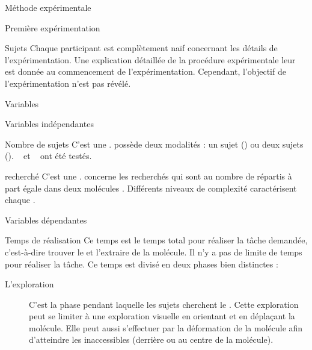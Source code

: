\documentclass[myfrancais,ngerman,english,french]{mythesis}
\begin{document}
\begin{mychapter}{Méthode expérimentale}
\begin{mysection}{Première expérimentation}
\begin{mysubsection}{Sujets}
				Chaque participant est complètement naïf concernant les détails de l'expérimentation.
				Une explication détaillée de la procédure expérimentale leur est donnée au commencement de l'expérimentation.
				Cependant, l'objectif de l'expérimentation n'est pas révélé.
			\end{mysubsection}
			\begin{mysubsection}{Variables}
				\begin{mysubsubsection}{Variables indépendantes}
					\begin{myparagraph}{ Nombre de sujets}
						C'est une .
						 possède deux modalités : \og un sujet \fg (\mycf {}) ou \og deux sujets \fg (\mycf {}).
						~ et ~ ont été testés.
					\end{myparagraph}
					\begin{myparagraph}{  recherché}
						C'est une .
						 concerne les  recherchés qui sont au nombre de  répartis à part égale dans deux molécules .
						Différents niveaux de complexité caractérisent chaque  .
					\end{myparagraph}
				\end{mysubsubsection}
				\begin{mysubsubsection}{Variables dépendantes}
					\begin{myparagraph}{ Temps de réalisation}
						Ce temps est le temps total pour réaliser la tâche demandée, c'est-à-dire trouver le  et l'extraire de la molécule.
						Il n'y a pas de limite de temps pour réaliser la tâche.
						Ce temps est divisé en deux phases bien distinctes :
						\begin{description}
							\item[L'exploration] C'est la phase pendant laquelle les sujets cherchent le .
								Cette exploration peut se limiter à une exploration visuelle en orientant et en déplaçant la molécule.
								Elle peut aussi s'effectuer par la déformation de la molécule afin d'atteindre les  inaccessibles (derrière ou au centre de la molécule).

\end{description}
\end{myparagraph}
\end{mysubsubsection}
\end{mysubsection}
\end{mysection}
\end{mychapter}
\end{document}
